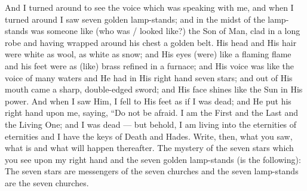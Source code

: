 \begin{pages}
\begin{Leftside}
		\pend
		\pstart
			And I turned around to see the voice which was speaking with me, and when I turned around I saw seven golden lamp-stands; and in the midst of the lamp-stands was someone like (who was / looked like?) the Son of Man, clad in a long robe and having wrapped around his chest a golden belt. His head and His hair were white as wool, as white as snow; and His eyes (were) like a flaming flame and his feet were as (like) brass refined in a furnace; and His voice was like the voice of many waters and He had in His right hand seven stars; and out of His mouth came a sharp, double-edged sword; and His face shines like the Sun in His power.
		\pend
		\pstart
			And when I saw Him, I fell to His feet as if I was dead; and He put his right hand upon me, saying, “Do not be afraid. I am the First and the Last and the Living One; and I was dead — but behold, I am living into the eternities of eternities and I have the keys of Death and Hades. Write, then, what you saw, what is and what will happen thereafter. The mystery of the seven stars which you see upon my right hand and the seven golden lamp-stands (is the following): The seven stars are messengers of the seven churches and the seven lamp-stands are the seven churches.
		\pend
        \endnumbering
    \end{Leftside}

\end{pages} 
\Pages

